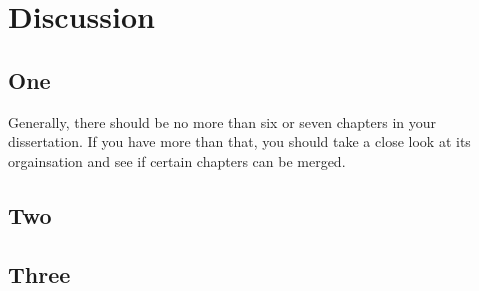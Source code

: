 
\chapter{Discussion}
\begin{spacing}{1.5}
\setlength{\parskip}{0.3in}

\section{One}

Generally, there should be no more than six or seven chapters in your dissertation. If you have more than that, you should take a close look at its orgainsation and see if certain chapters can be merged.

\section{Two}

\section{Three}


\end{spacing}
\newpage
